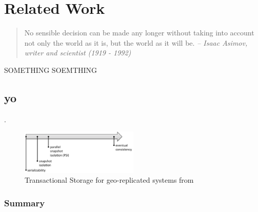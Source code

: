 \chapter{Related Work}
\label{ch:relatedwork}

\begin{quotation}
No sensible decision can be made any longer without taking into account not only the world as it is, but the world as it will be.
{\small\it -- Isaac Asimov, writer and scientist (1919 - 1992)}
\end{quotation}


SOMETHING SOEMTHING
\section{yo}

\cite{Saphiro:2011}.

\begin{figure}[h]
\centering
\includegraphics[width=0.5\textwidth]{figs/consistency}
\caption{Transactional Storage for geo-replicated systems from \protect\cite{Sovran:2011}}
\end{figure}




\subsection*{Summary}

